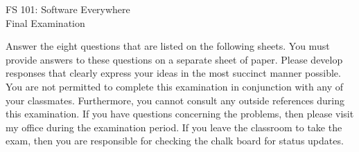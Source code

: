 \documentclass[12pt]{article}
\def\widow#1{\vskip #1\vbadness10000\penalty-200\vskip-#1}
\begin{document}
\def\widow#1{\vskip #1\vbadness10000\penalty-200\vskip-#1}

\begin{center}

FS 101: Software Everywhere \\
Final Examination \\

\end{center}

\noindent
Answer the eight questions that are listed on the following sheets.  You
must provide answers to these questions on a separate sheet of paper.
Please develop responses that clearly express your ideas in the most
succinct manner possible.  You are not permitted to complete this
examination in conjunction with any of your classmates.  Furthermore,
you cannot consult any outside references during this examination.  If
you have questions concerning the problems, then please visit my
office during the examination period.  If you leave the classroom to
take the exam, then you are responsible for checking the chalk board
for status updates.

\newpage
\end{document}
